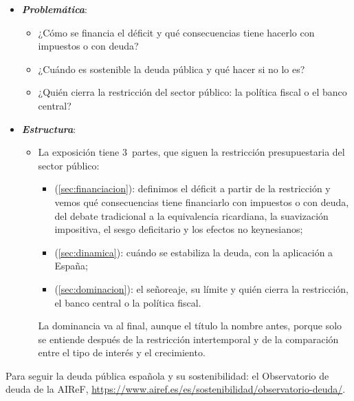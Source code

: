 \documentclass[11pt]{article}
\begin{document}
\begin{itemize}
\item \textbf{\emph{Problemática}}:
  \begin{itemize}
  \item ¿Cómo se financia el déficit y qué consecuencias tiene hacerlo con impuestos o con deuda?
  \item ¿Cuándo es sostenible la deuda pública y qué hacer si no lo es?
  \item ¿Quién cierra la restricción del sector público: la política fiscal o el banco central?
  \end{itemize}

\item \textbf{\emph{Estructura}}:
  \begin{itemize}
  \item La exposición tiene 3~partes, que siguen la restricción presupuestaria del sector público:
  \begin{itemize}
  \item {} (\ref{sec:financiacion}): definimos el déficit a partir de la restricción y vemos qué consecuencias tiene financiarlo con impuestos o con deuda, del debate tradicional a la equivalencia ricardiana, la suavización impositiva, el sesgo deficitario y los efectos no keynesianos;
  \item {} (\ref{sec:dinamica}): cuándo se estabiliza la deuda, con la aplicación a España;
  \item {} (\ref{sec:dominacion}): el señoreaje, su límite y quién cierra la restricción, el banco central o la política fiscal.
  \end{itemize}
  La dominancia va al final, aunque el título la nombre antes, porque solo se entiende después de la restricción intertemporal y de la comparación entre el tipo de interés y el crecimiento.
  \end{itemize}
\end{itemize}

\begin{anotaciones}
Para seguir la deuda pública española y su sostenibilidad: el Observatorio de deuda de la AIReF, \url{https://www.airef.es/es/sostenibilidad/observatorio-deuda/}\nocite{AIReF2026Observatorio}.
\end{anotaciones}
\end{document}
